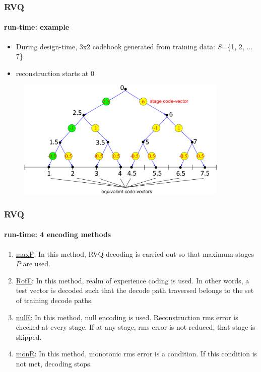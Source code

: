 \begin{frame}
\frametitle{RVQ}
\framesubtitle{run-time: example}
\logoCSIPCPL\mypagenum
\begin{itemize}
\item During design-time, 3x2 codebook generated from training data: $S$=\{1, 2, ... 7\}
\item reconstruction starts at 0
\end{itemize}
\begin{figure}[t]
\centering
\includegraphics[width=0.9\textwidth]{thesis/RVQ_trg_1_to_7_equivalentCVs.pdf}
\end{figure}
\end{frame}



\begin{frame}
\frametitle{RVQ}
\framesubtitle{run-time: 4 encoding methods}
\logoCSIPCPL\mypagenum
\begin{enumerate}
\item \underline{maxP}: In this method, RVQ decoding is carried out so that maximum stages $P$ are used.
\item \underline{RofE}: In this method, realm of experience coding is used.  In other words, a test vector is decoded such that the decode path traversed belongs to the set of training decode paths.
\item \underline{nulE}: In this method, null encoding is used.  Reconstruction rms error is checked at every stage.  If at any stage, rms error is not reduced, that stage is skipped.
\item \underline{monR}: In this method, monotonic rms error is a condition.  If this condition is not met, decoding stops.
\end{enumerate}
\end{frame}



